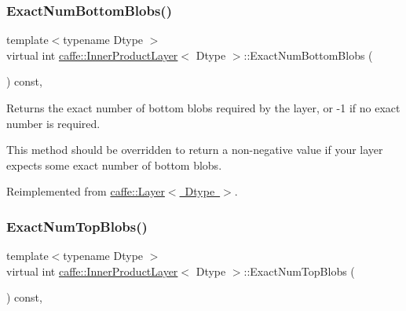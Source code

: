 \subsubsection{\texorpdfstring{Exact\+Num\+Bottom\+Blobs()}{ExactNumBottomBlobs()}\hspace{0.1cm}{\footnotesize\ttfamily [2/2]}}
{\footnotesize\ttfamily template$<$typename Dtype $>$ \\
virtual int \mbox{\hyperlink{classcaffe_1_1_inner_product_layer}{caffe\+::\+Inner\+Product\+Layer}}$<$ Dtype $>$\+::Exact\+Num\+Bottom\+Blobs (\begin{DoxyParamCaption}{ }\end{DoxyParamCaption}) const\hspace{0.3cm}{\ttfamily [inline]}, {\ttfamily [virtual]}}



Returns the exact number of bottom blobs required by the layer, or -\/1 if no exact number is required. 

This method should be overridden to return a non-\/negative value if your layer expects some exact number of bottom blobs. 

Reimplemented from \mbox{\hyperlink{classcaffe_1_1_layer_a8e5ee0494d85f5f55fc4396537cbc60f}{caffe\+::\+Layer$<$ Dtype $>$}}.

\mbox{\label{classcaffe_1_1_inner_product_layer_a652d8a5b07b72938a81f50305c1a8ee1}} 
\subsubsection{\texorpdfstring{Exact\+Num\+Top\+Blobs()}{ExactNumTopBlobs()}\hspace{0.1cm}{\footnotesize\ttfamily [1/2]}}
{\footnotesize\ttfamily template$<$typename Dtype $>$ \\
virtual int \mbox{\hyperlink{classcaffe_1_1_inner_product_layer}{caffe\+::\+Inner\+Product\+Layer}}$<$ Dtype $>$\+::Exact\+Num\+Top\+Blobs (\begin{DoxyParamCaption}{ }\end{DoxyParamCaption}) const\hspace{0.3cm}{\ttfamily [inline]}, {\ttfamily [virtual]}}



